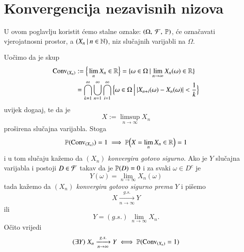 
\chapter{Konvergencija nezavisnih nizova}

U ovom poglavlju koristit \' cemo stalne oznake: $(\Omega, \: \mathcal{F}, \: \mathbb{P})$, \' ce ozna\v cavati vjerojatnosni prostor, a $({X_n} \: | \: {n \in \mathbb{N}})$, niz slu\v cajnih varijabli na $\Omega$.

Uo\v cimo da je skup
\begin{equation*}
    \begin{aligned}
        \mathrm{Conv}_{(X_n)} &:= \Big\{ \lim\limits_{n} X_n \in \mathbb{R} \Big\} = \{{\omega \in \Omega} \: | \: {\lim\limits_{n \to \infty} X_n (\omega) \in \mathbb{R}}\}\\
        &= \bigcap\limits_{k = 1}^{\infty} \bigcup\limits_{n = 1}^{\infty} \bigcap\limits_{i = 1}^{\infty} \Big\{ {\omega \in \Omega} \: \Big| \: {|X_{n + i} (\omega) - X_n (\omega)| < \frac{1}{k}} \Big\}
    \end{aligned}
\end{equation*}
uvijek doga\dj aj, te da je
\begin{equation*}
    X:= \limsup\limits_{n \to \infty} X_n
\end{equation*}
pro\v sirena slu\v cajna varijabla.
Stoga
\begin{equation}    \label{jed:11.1}
    \mathbb{P}({\mathrm{Conv}_{(X_n)}}) = 1 \implies \mathbb{P} \Big( X = \lim\limits_n X_n \in \mathbb{R} \Big) = 1
\end{equation}
i u tom slu\v caju ka\v zemo da $(X_n)$ \emph{konvergira gotovo sigurno}.
Ako je $Y$ slu\v cajna varijabla i postoji $D \in \mathcal{F}$ takav da je $\mathbb{P}({D}) = 0$ i za svaki $\omega \in D^c$ je
\begin{equation*}
    Y(\omega) = \lim\limits_{n \to \infty} X_n (\omega)
\end{equation*}
tada ka\v zemo da $(X_n)$ \emph{konvergira gotovo sigurno prema} $Y$ i pi\v semo
\begin{equation*}
    X \xrightarrow[n \to \infty]{g.s.} Y
\end{equation*}
ili
\begin{equation*}
    Y = (g.s.) \; \lim\limits_{n \to \infty} X_n.
\end{equation*}
O\v cito vrijedi
\begin{equation}    \label{jed:11.2}
    (\exists Y) \; X_n \xrightarrow[n \to \infty]{g.s.} Y \iff \mathbb{P}({\mathrm{Conv}_{(X_n)} = 1})
\end{equation}
